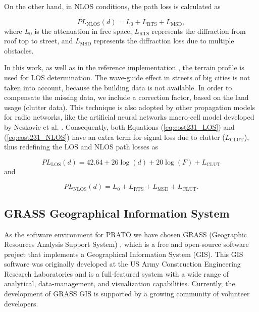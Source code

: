 On the other hand, in NLOS conditions, the path loss is calculated
as

\begin{equation}
PL_{\textrm{NLOS}}(d)=L_{0}+L_{\textrm{RTS}}+L_{\textrm{MSD}},\label{eq:cost231_NLOS}
\end{equation}
where $L_{0}$ is the attenuation in free space, $L_{\textrm{RTS}}$
represents the diffraction from roof top to street, and $L_{\textrm{MSD}}$
represents the diffraction loss due to multiple obstacles.

In this work, as well as in the reference implementation \cite{Ozimek_Open.source.radio.coverage.prediction:2010},
the terrain profile is used for LOS determination. The wave-guide
effect in streets of big cities is not taken into account, because
the building data is not available. In order to compensate the missing
data, we include a correction factor, based on the land usage (clutter
data). This technique is also adopted by other propagation models
for radio networks, like the artificial neural networks macro-cell
model developed by Neskovic et al. \cite{Neskovic_Microcell_electric_field_strength_prediction_model:2010}.
Consequently, both Equations (\ref{eq:cost231_LOS}) and (\ref{eq:cost231_NLOS})
have an extra term for signal loss due to clutter ($L_{\textrm{CLUT}}$),
thus redefining the LOS and NLOS path losses as

\begin{equation}
PL_{\textrm{LOS}}(d)=42.64+26\log(d)+20\log(F)+L_{\textrm{CLUT}}\label{eq:cost231_LOS-1}
\end{equation}
and

\begin{equation}
PL_{\textrm{NLOS}}(d)=L_{0}+L_{\textrm{RTS}}+L_{\textrm{MSD}}+L_{\textrm{CLUT}}.\label{eq:cost231_NLOS-1}
\end{equation}



\subsection{GRASS Geographical Information System\label{sub:GRASS-GIS}}

As the software environment for PRATO we have chosen GRASS (Geographic
Resources Analysis Support System) \cite{neteler2002:GRASS_GIS},
which is a free and open-source software project that implements a
Geographical Information System (GIS). This GIS software was originally
developed at the US Army Construction Engineering Research Laboratories
and is a full-featured system with a wide range of analytical, data-management,
and visualization capabilities. Currently, the development of GRASS
GIS is supported by a growing community of volunteer developers.

